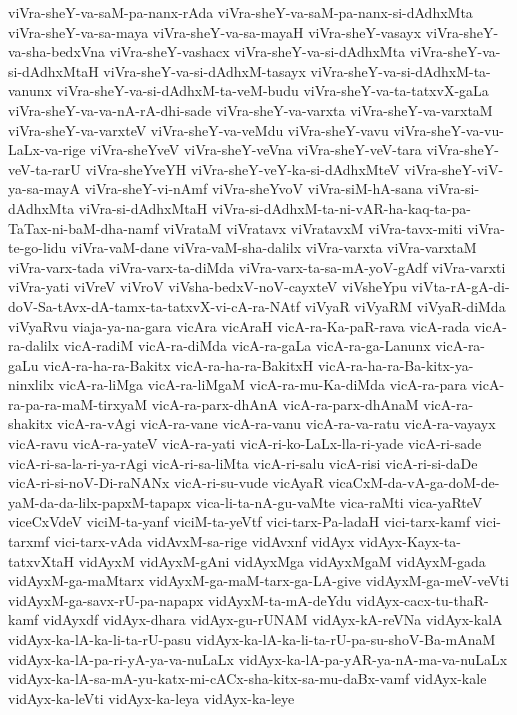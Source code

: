 {viVra-sheY-va-saM-pa-nanx-rAda
viVra-sheY-va-saM-pa-nanx-si-dAdhxMta
viVra-sheY-va-sa-maya
viVra-sheY-va-sa-mayaH
viVra-sheY-vasayx
viVra-sheY-va-sha-bedxVna
viVra-sheY-vashacx
viVra-sheY-va-si-dAdhxMta
viVra-sheY-va-si-dAdhxMtaH
viVra-sheY-va-si-dAdhxM-tasayx
viVra-sheY-va-si-dAdhxM-ta-vanunx
viVra-sheY-va-si-dAdhxM-ta-veM-budu
viVra-sheY-va-ta-tatxvX-gaLa
viVra-sheY-va-va-nA-rA-dhi-sade
viVra-sheY-va-varxta
viVra-sheY-va-varxtaM
viVra-sheY-va-varxteV
viVra-sheY-va-veMdu
viVra-sheY-vavu
viVra-sheY-va-vu-LaLx-va-rige
viVra-sheYveV
viVra-sheY-veVna
viVra-sheY-veV-tara
viVra-sheY-veV-ta-rarU
viVra-sheYveYH
viVra-sheY-veY-ka-si-dAdhxMteV
viVra-sheY-viV-ya-sa-mayA
viVra-sheY-vi-nAmf
viVra-sheYvoV
viVra-siM-hA-sana
viVra-si-dAdhxMta
viVra-si-dAdhxMtaH
viVra-si-dAdhxM-ta-ni-vAR-ha-kaq-ta-pa-TaTax-ni-baM-dha-namf
viVrataM
viVratavx
viVratavxM
viVra-tavx-miti
viVra-te-go-lidu
viVra-vaM-dane
viVra-vaM-sha-dalilx
viVra-varxta
viVra-varxtaM
viVra-varx-tada
viVra-varx-ta-diMda
viVra-varx-ta-sa-mA-yoV-gAdf
viVra-varxti
viVra-yati
viVreV
viVroV
viVsha-bedxV-noV-cayxteV
viVsheYpu
viVta-rA-gA-di-doV-Sa-tAvx-dA-tamx-ta-tatxvX-vi-cA-ra-NAtf
viVyaR
viVyaRM
viVyaR-diMda
viVyaRvu
viaja-ya-na-gara
vicAra
vicAraH
vicA-ra-Ka-paR-rava
vicA-rada
vicA-ra-dalilx
vicA-radiM
vicA-ra-diMda
vicA-ra-gaLa
vicA-ra-ga-Lanunx
vicA-ra-gaLu
vicA-ra-ha-ra-Bakitx
vicA-ra-ha-ra-BakitxH
vicA-ra-ha-ra-Ba-kitx-ya-ninxlilx
vicA-ra-liMga
vicA-ra-liMgaM
vicA-ra-mu-Ka-diMda
vicA-ra-para
vicA-ra-pa-ra-maM-tirxyaM
vicA-ra-parx-dhAnA
vicA-ra-parx-dhAnaM
vicA-ra-shakitx
vicA-ra-vAgi
vicA-ra-vane
vicA-ra-vanu
vicA-ra-va-ratu
vicA-ra-vayayx
vicA-ravu
vicA-ra-yateV
vicA-ra-yati
vicA-ri-ko-LaLx-lla-ri-yade
vicA-ri-sade
vicA-ri-sa-la-ri-ya-rAgi
vicA-ri-sa-liMta
vicA-ri-salu
vicA-risi
vicA-ri-si-daDe
vicA-ri-si-noV-Di-raNANx
vicA-ri-su-vude
vicAyaR
vicaCxM-da-vA-ga-doM-de-yaM-da-da-lilx-papxM-tapapx
vica-li-ta-nA-gu-vaMte
vica-raMti
vica-yaRteV
viceCxVdeV
viciM-ta-yanf
viciM-ta-yeVtf
vici-tarx-Pa-ladaH
vici-tarx-kamf
vici-tarxmf
vici-tarx-vAda
vidAvxM-sa-rige
vidAvxnf
vidAyx
vidAyx-Kayx-ta-tatxvXtaH
vidAyxM
vidAyxM-gAni
vidAyxMga
vidAyxMgaM
vidAyxM-gada
vidAyxM-ga-maMtarx
vidAyxM-ga-maM-tarx-ga-LA-give
vidAyxM-ga-meV-veVti
vidAyxM-ga-savx-rU-pa-napapx
vidAyxM-ta-mA-deYdu
vidAyx-cacx-tu-thaR-kamf
vidAyxdf
vidAyx-dhara
vidAyx-gu-rUNAM
vidAyx-kA-reVNa
vidAyx-kalA
vidAyx-ka-lA-ka-li-ta-rU-pasu
vidAyx-ka-lA-ka-li-ta-rU-pa-su-shoV-Ba-mAnaM
vidAyx-ka-lA-pa-ri-yA-ya-va-nuLaLx
vidAyx-ka-lA-pa-yAR-ya-nA-ma-va-nuLaLx
vidAyx-ka-lA-sa-mA-yu-katx-mi-cACx-sha-kitx-sa-mu-daBx-vamf
vidAyx-kale
vidAyx-ka-leVti
vidAyx-ka-leya
vidAyx-ka-leye
}
